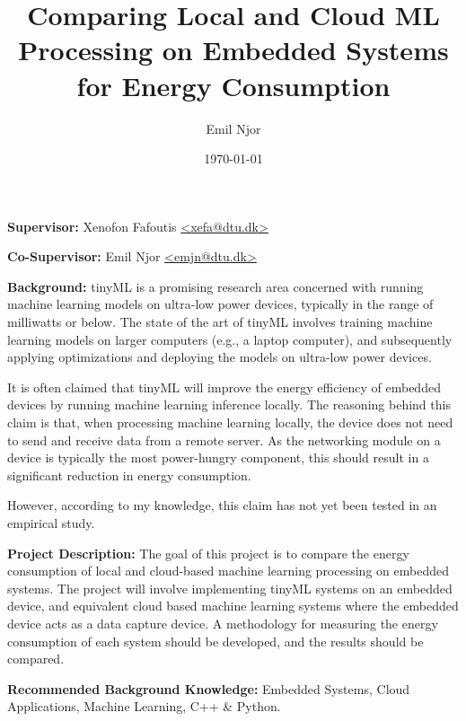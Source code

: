 \documentclass{article}
\author{Emil Njor}
\title{Comparing Local and Cloud ML Processing on Embedded Systems for Energy Consumption}
\date{\today}
\begin{document}
\maketitle
\textbf{Supervisor:} Xenofon Fafoutis \href{mailto:xefa@dtu.dk}{\textless{}xefa@dtu.dk\textgreater}

\textbf{Co-Supervisor:} Emil Njor \href{mailto:emjn@dtu.dk}{\textless{}emjn@dtu.dk\textgreater}

\textbf{Background:} tinyML is a promising research area concerned with running machine learning models on ultra-low power devices, typically in the range of milliwatts or below.
The state of the art of tinyML involves training machine learning models on larger computers (e.g., a laptop computer), and subsequently applying optimizations and deploying the models on ultra-low power devices.

It is often claimed that tinyML will improve the energy efficiency of embedded devices by running machine learning inference locally.
The reasoning behind this claim is that, when processing machine learning locally, the device does not need to send and receive data from a remote server.
As the networking module on a device is typically the most power-hungry component, this should result in a significant reduction in energy consumption.

However, according to my knowledge, this claim has not yet been tested in an empirical study.

\textbf{Project Description:} The goal of this project is to compare the energy consumption of local and cloud-based machine learning processing on embedded systems.
The project will involve implementing tinyML systems on an embedded device, and equivalent cloud based machine learning systems where the embedded device acts as a data capture device.
A methodology for measuring the energy consumption of each system should be developed, and the results should be compared.


\textbf{Recommended Background Knowledge:} Embedded Systems, Cloud Applications, Machine Learning, C++ \& Python.
\end{document}
